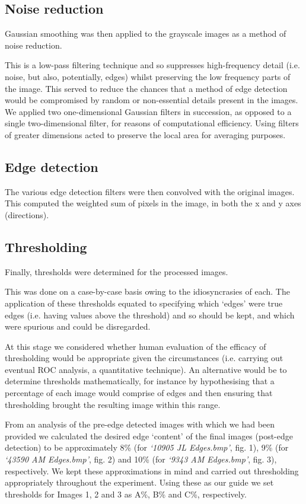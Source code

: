 \documentclass{article}
\begin{document}
\begin{article}
\subsection{Noise reduction}

Gaussian smoothing was then applied to the grayscale images as a method of noise reduction. \par
This is a low-pass filtering technique and so suppresses high-frequency detail (i.e. noise, but also, potentially, edges) whilst preserving the low frequency parts of the image. This served to reduce the chances that a method of edge detection would be compromised by random or non-essential details present in the images. We applied two one-dimensional Gaussian filters in succession, as opposed to a single two-dimensional filter, for reasons of computational efficiency. Using filters of greater dimensions acted to preserve the local area for averaging purposes. 

\subsection{Edge detection}

The various edge detection filters were then convolved with the original images. This computed the weighted sum of pixels in the image, in both the x and y axes (directions).

\subsection{Thresholding}

Finally, thresholds were determined for the processed images. \par
This was done on a case-by-case basis owing to the idiosyncrasies of each. The application of these thresholds equated to specifying which ‘edges’ were true edges (i.e. having values above the threshold) and so should be kept, and which were spurious and could be disregarded. \par
At this stage we considered whether human evaluation of the efficacy of thresholding would be appropriate given the circumstances (i.e. carrying out eventual ROC analysis, a quantitative technique). An alternative would be to determine thresholds mathematically, for instance by hypothesising that a percentage of each image would comprise of edges and then ensuring that thresholding brought the resulting image within this range. \par
From an analysis of the pre-edge detected images with which we had been provided we calculated the desired edge ‘content’ of the final images (post-edge detection) to be approximately 8\% (for \textit{‘10905 JL Edges.bmp’}, fig. 1), 9\% (for \textit{‘43590 AM Edges.bmp’}, fig. 2) and 10\% (for \textit{‘9343 AM Edges.bmp’}, fig. 3), respectively. We kept these approximations in mind and carried out thresholding appropriately throughout the experiment. Using these as our guide we set thresholds for Images 1, 2 and 3 as A\%, B\% and C\%, respectively. 


\end{article}
\end{document}
